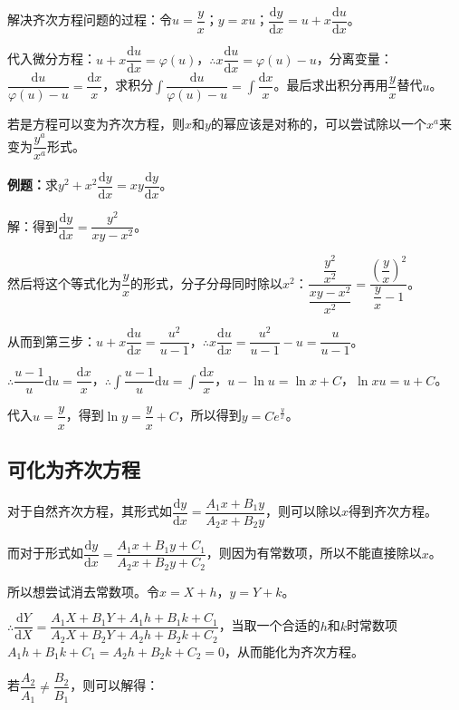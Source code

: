 \documentclass[UTF8, 12pt]{ctexart}
\begin{document}
解决齐次方程问题的过程：令$u=\dfrac{y}{x}$；$y=xu$；$\dfrac{\textrm{d}y}{\textrm{d}x}=u+x\dfrac{\textrm{d}u}{\textrm{d}x}$。

代入微分方程：$u+x\dfrac{\textrm{d}u}{\textrm{d}x}=\varphi(u)$，$\therefore x\dfrac{\textrm{d}u}{\textrm{d}x}=\varphi(u)-u$，分离变量：$\dfrac{\textrm{d}u}{\varphi(u)-u}=\dfrac{\textrm{d}x}{x}$，求积分$\displaystyle{\int\dfrac{\textrm{d}u}{\varphi(u)-u}=\int\dfrac{\textrm{d}x}{x}}$。最后求出积分再用$\dfrac{y}{x}$替代$u$。

若是方程可以变为齐次方程，则$x$和$y$的幂应该是对称的，可以尝试除以一个$x^a$来变为$\dfrac{y^a}{x^a}$形式。

\textbf{例题：}求$y^2+x^2\dfrac{\textrm{d}y}{\textrm{d}x}=xy\dfrac{\textrm{d}y}{\textrm{d}x}$。

解：得到$\dfrac{\textrm{d}y}{\textrm{d}x}=\dfrac{y^2}{xy-x^2}$。

然后将这个等式化为$\dfrac{y}{x}$的形式，分子分母同时除以$x^2$：$\dfrac{\dfrac{y^2}{x^2}}{\dfrac{xy-x^2}{x^2}}=\dfrac{\left(\dfrac{y}{x}\right)^2}{\dfrac{y}{x}-1}$。

从而到第三步：$u+x\dfrac{\textrm{d}u}{\textrm{d}x}=\dfrac{u^2}{u-1}$，$\therefore x\dfrac{\textrm{d}u}{\textrm{d}x}=\dfrac{u^2}{u-1}-u=\dfrac{u}{u-1}$。

$\therefore\dfrac{u-1}{u}\textrm{d}u=\dfrac{\textrm{d}x}{x}$，$\therefore\displaystyle{\int\dfrac{u-1}{u}\textrm{d}u=\int\dfrac{\textrm{d}x}{x}}$，$u-\ln u=\ln x+C$，$\ln xu=u+C$。

代入$u=\dfrac{y}{x}$，得到$\ln y=\dfrac{y}{x}+C$，所以得到$y=Ce^{\frac{y}{x}}$。

\subsection{可化为齐次方程}

对于自然齐次方程，其形式如$\dfrac{\textrm{d}y}{\textrm{d}x}=\dfrac{A_1x+B_1y}{A_2x+B_2y}$，则可以除以$x$得到齐次方程。

而对于形式如$\dfrac{\textrm{d}y}{\textrm{d}x}=\dfrac{A_1x+B_1y+C_1}{A_2x+B_2y+C_2}$，则因为有常数项，所以不能直接除以$x$。

所以想尝试消去常数项。令$x=X+h$，$y=Y+k$。\medskip

$\therefore\dfrac{\textrm{d}Y}{\textrm{d}X}=\dfrac{A_1X+B_1Y+A_1h+B_1k+C_1}{A_2X+B_2Y+A_2h+B_2k+C_2}$，当取一个合适的$h$和$k$时常数项$A_1h+B_1k+C_1=A_2h+B_2k+C_2=0$，从而能化为齐次方程。

若$\dfrac{A_2}{A_1}\neq\dfrac{B_2}{B_1}$，则可以解得：\medskip
\end{document}
